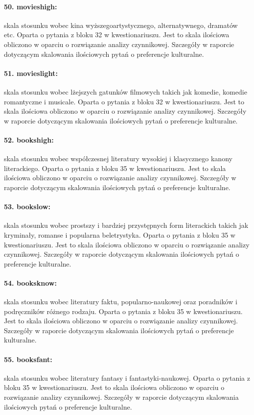 \documentclass[10pt, a4paper]{article}
\begin{document}
\paragraph{50. movieshigh:} skala stosunku wobec kina wyższego\textemdash artystycznego, alternatywnego, dramatów etc. Oparta o pytania z bloku 32 w kwestionariuszu. Jest to skala ilościowa obliczono w oparciu o rozwiązanie analizy czynnikowej. Szczegóły w raporcie dotyczącym skalowania ilościowych pytań o preferencje kulturalne.
\paragraph{51. movieslight:} skala stosunku wobec lżejszych gatunków filmowych takich jak komedie, komedie romantyczne i musicale. Oparta o pytania z bloku 32 w kwestionariuszu. Jest to skala ilościowa obliczono w oparciu o rozwiązanie analizy czynnikowej. Szczegóły w raporcie dotyczącym skalowania ilościowych pytań o preferencje kulturalne.
\paragraph{52. bookshigh:} skala stosunku wobec współczesnej literatury wysokiej i klasycznego kanony literackiego. Oparta o pytania z bloku 35 w kwestionariuszu. Jest to skala ilościowa obliczono w oparciu o rozwiązanie analizy czynnikowej. Szczegóły w raporcie dotyczącym skalowania ilościowych pytań o preferencje kulturalne.
\paragraph{53. bookslow:} skala stosunku wobec prostszy i bardziej przystępnych form literackich takich jak kryminały, romanse i popularna beletrystyka. Oparta o pytania z bloku 35 w kwestionariuszu. Jest to skala ilościowa obliczono w oparciu o rozwiązanie analizy czynnikowej. Szczegóły w raporcie dotyczącym skalowania ilościowych pytań o preferencje kulturalne.
\paragraph{54. booksknow:} skala stosunku wobec literatury faktu, popularno-naukowej oraz poradników i podręczników różnego rodzaju. Oparta o pytania z bloku 35 w kwestionariuszu. Jest to skala ilościowa obliczono w oparciu o rozwiązanie analizy czynnikowej. Szczegóły w raporcie dotyczącym skalowania ilościowych pytań o preferencje kulturalne.
\paragraph{55. booksfant:} skala stosunku wobec literatury fantasy i fantastyki-naukowej. Oparta o pytania z bloku 35 w kwestionariuszu. Jest to skala ilościowa obliczono w oparciu o rozwiązanie analizy czynnikowej. Szczegóły w raporcie dotyczącym skalowania ilościowych pytań o preferencje kulturalne.
\end{document}

